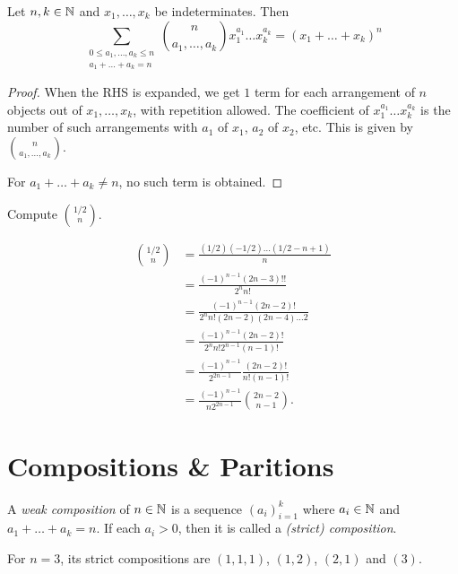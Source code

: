 
\begin{theorem} \label{thm:multinomial}
    Let $n, k \in \mathbb{N}$ and $x_1, \dots, x_k$ be indeterminates.
    Then \[
        \sum_{\substack{0\le a_1, \dots, a_k \le n \\ a_1 + \dots + a_k = n}}
        \binom{n}{a_1, \dots, a_k} x_1^{a_1} \dots x_k^{a_k} = (x_1 + \dots + x_k)^n
    \]
\end{theorem}
\begin{proof}
    When the RHS is expanded, we get $1$ term for each arrangement of $n$
    objects out of $x_1, \dots, x_k$, with repetition allowed.
    The coefficient of $x_1^{a_1} \dots x_k^{a_k}$ is the number of such
    arrangements with $a_1$ of $x_1$, $a_2$ of $x_2$, etc.
    This is given by $\binom{n}{a_1, \dots, a_k}$.

    For $a_1 + \dots + a_k \ne n$, no such term is obtained.
\end{proof}

\begin{exercise} \label{thm:half_choose}
    Compute $\binom{1/2}{n}$.
\end{exercise}
\begin{solution}
    \begin{align*}
        \binom{1/2}{n}
            &= \frac{(1/2)(-1/2) \dots (1/2 - n + 1)}{n} \\
            &= \frac{(-1)^{n-1} (2n - 3)!!}{2^n n!} \\
            &= \frac{(-1)^{n-1} (2n - 2)!}{2^n n! (2n-2)(2n-4) \dots 2} \\
            &= \frac{(-1)^{n-1} (2n - 2)!}{2^n n! 2^{n-1} (n-1)!} \\
            &= \frac{(-1)^{n-1}}{2^{2n-1}} \frac{(2n-2)!}{n! (n-1)!} \\
            &= \frac{(-1)^{n-1}}{n 2^{2n-1}} \binom{2n-2}{n-1}.
    \end{align*}
\end{solution}

\section{Compositions \& Paritions} \label{sec:comp/part}

\begin{definition*} \label{def:composition}
    A \emph{weak composition} of $n \in \mathbb{N}$ is a sequence $(a_i)_{i=1}^k$
    where $a_i \in \mathbb{N}$ and $a_1 + \dots + a_k = n$.
    If each $a_i > 0$, then it is called a \emph{(strict) composition}.
\end{definition*}
\begin{example}
    For $n = 3$, its strict compositions are $(1, 1, 1)$, $(1, 2)$, $(2, 1)$
    and $(3)$.
\end{example}

